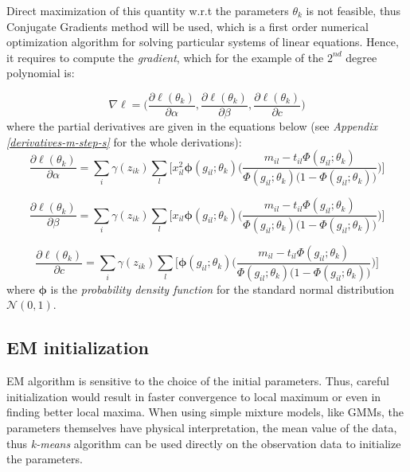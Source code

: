 Direct maximization of this quantity w.r.t the parameters $\theta_{k}$ is not feasible, thus Conjugate Gradients method \citep{Hestenes1952} will be used, which is a first order numerical optimization algorithm for solving particular systems of linear equations. Hence, it requires to compute the \emph{gradient}, which for the example of the $2^{nd}$ degree polynomial is:

\begin{equation} \label{gradient-f}
	\nabla\ell = \bigg( \frac{\partial \ell(\theta_{k})}{\partial \alpha}, \frac{\partial \ell(\theta_{k})}{\partial \beta}, \frac{\partial \ell(\theta_{k})}{\partial c}\bigg) 
\end{equation}
where the partial derivatives are given in the equations below (see \emph{Appendix \ref{derivatives-m-step-s}} for the whole derivations):
\begin{equation} \label{derivative-a-f}
	\frac{\partial \ell(\theta_{k})}{\partial \alpha} =  \sum_{i}  \gamma(z_{ik}) \sum_{l} \bigg[ x_{il}^{2} \mathbf{\phi}(g_{il};\theta_{k})\bigg(\frac{m_{il} - t_{il}\Phi(g_{il};\theta_{k})}{\Phi(g_{il};\theta_{k})\big(1-\Phi(g_{il};\theta_{k})\big)} \bigg) \bigg]
\end{equation}

\begin{equation} \label{derivative-b-f}
	\frac{\partial \ell(\theta_{k})}{\partial \beta} =  \sum_{i}  \gamma(z_{ik}) \sum_{l} \bigg[ x_{il} \mathbf{\phi}(g_{il};\theta_{k})\bigg(\frac{m_{il} - t_{il}\Phi(g_{il};\theta_{k})}{\Phi(g_{il};\theta_{k})\big(1-\Phi(g_{il};\theta_{k})\big)} \bigg) \bigg]
\end{equation}

\begin{equation} \label{derivative-c-f}
	\frac{\partial \ell(\theta_{k})}{\partial c} =  \sum_{i}  \gamma(z_{ik}) \sum_{l} \bigg[ \mathbf{\phi}(g_{il};\theta_{k})\bigg(\frac{m_{il} - t_{il}\Phi(g_{il};\theta_{k})}{\Phi(g_{il};\theta_{k})\big(1-\Phi(g_{il};\theta_{k})\big)} \bigg) \bigg]
\end{equation}
where $\mathbf{\phi}$ is the \emph{probability density function} for the standard normal distribution $\mathcal{N}(0,1)$.

\subsection{EM initialization}
EM algorithm is sensitive to the choice of the initial parameters. Thus, careful initialization would result in faster convergence to local maximum or even in finding better local maxima. When using simple mixture models, like GMMs, the parameters themselves have physical interpretation, \eg the mean value of the data, thus \emph{k-means} algorithm can be used directly on the observation data to initialize the parameters.

